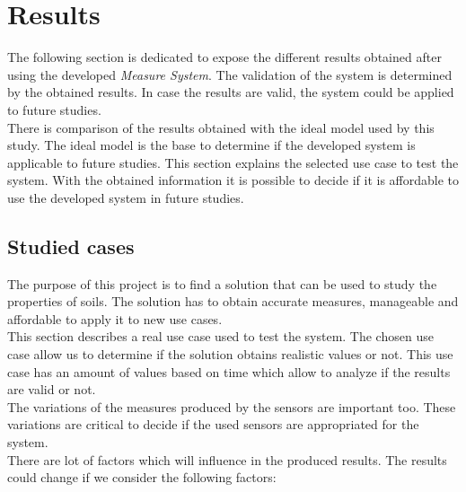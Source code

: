 
\chapter{Results}
\newpage

The following section is dedicated to expose the different results obtained after using the developed \textit{Measure System}. The validation of the system is determined by the obtained results. In case the results are valid, the system could be applied to future studies.\\

There is comparison of the results obtained with the ideal model used by this study. The ideal model is the base to determine if the developed system is applicable to future studies. This section explains the selected use case to test the system. With the obtained information it is possible to decide if it is affordable to use the developed system in future studies.

\section{Studied cases}

The purpose of this project is to find a solution that can be used to study the properties of soils. The solution has to obtain accurate measures, manageable and affordable to apply it to new use cases.\\

This section describes a real use case used to test the system. The chosen use case allow us to determine if the solution obtains realistic values or not. This use case has an amount of values based on time which allow to analyze if the results are valid or not.\\

The variations of the measures produced by the sensors are important too. These variations are critical to decide if the used sensors are appropriated for the system.\\

There are lot of factors which will influence in the produced results. The results could change if we consider the following factors:

